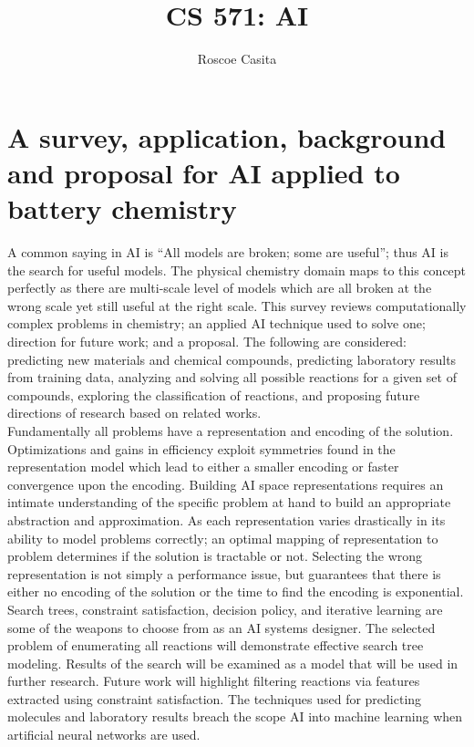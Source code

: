 \documentclass{article}
\title{CS 571: AI}
\author{Roscoe Casita}
\date{}
\begin{document}
\maketitle
\section{A survey, application, background and proposal for AI applied to battery chemistry}

A common saying in AI is ``All models are broken; some are useful''; thus AI is the search for useful models. The physical chemistry domain maps to this concept perfectly as there are multi-scale level of models which are all broken at the wrong scale yet still useful at the right scale. This survey reviews computationally complex problems in chemistry; an applied AI technique used to solve one; direction for future work; and a proposal. The following are considered: predicting new materials and chemical compounds, predicting laboratory results from training data, analyzing and solving all possible reactions for a given set of compounds, exploring the classification of reactions, and proposing future directions of research based on related works. \\

Fundamentally all problems have a representation and encoding of the solution. Optimizations and gains in efficiency exploit symmetries found in the representation model which lead to either a smaller encoding or faster convergence upon the encoding. Building AI space representations requires an intimate understanding of the specific problem at hand to build an appropriate abstraction and approximation.  As each representation varies drastically in its ability to model problems correctly; an optimal mapping of representation to problem determines if the solution is tractable or not. Selecting the wrong representation is not simply a performance issue, but guarantees that there is either no encoding of the solution or the time to find the encoding is exponential.\\

Search trees, constraint satisfaction, decision policy, and iterative learning are some of the weapons to choose from as an AI systems designer. The selected problem of enumerating all reactions will demonstrate effective search tree modeling. Results of the search will be examined as a model that will be used in further research. Future work will highlight filtering reactions via features extracted using constraint satisfaction. The techniques used for predicting molecules and laboratory results breach the scope AI into machine learning when artificial neural networks are used.
\newpage
\end{document}
